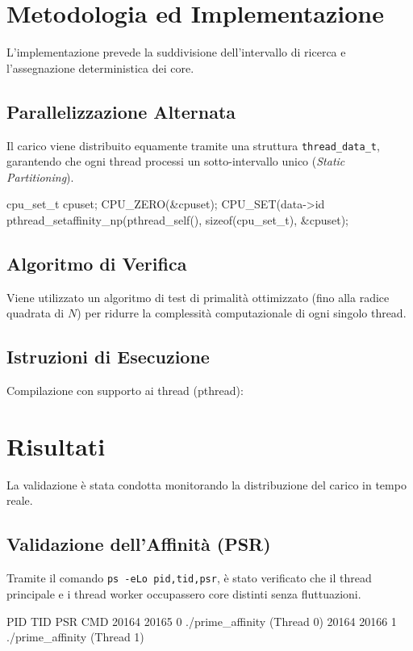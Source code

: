 \documentclass[a4paper,12pt]{article}
\begin{document}
\section{Metodologia ed Implementazione}
L'implementazione prevede la suddivisione dell'intervallo di ricerca e l'assegnazione deterministica dei core.

\subsection{Parallelizzazione Alternata}
Il carico viene distribuito equamente tramite una struttura \texttt{thread\_data\_t}, garantendo che ogni thread processi un sotto-intervallo unico (\textit{Static Partitioning}).
\begin{ccode}
cpu_set_t cpuset;
CPU_ZERO(&cpuset);
CPU_SET(data->id %
pthread_setaffinity_np(pthread_self(), sizeof(cpu_set_t), &cpuset);
\end{ccode}

\subsection{Algoritmo di Verifica}
Viene utilizzato un algoritmo di test di primalità ottimizzato (fino alla radice quadrata di $N$) per ridurre la complessità computazionale di ogni singolo thread.


\subsection{Istruzioni di Esecuzione}
Compilazione con supporto ai thread (pthread):

\section{Risultati}
La validazione è stata condotta monitorando la distribuzione del carico in tempo reale.

\subsection{Validazione dell'Affinità (PSR)}
Tramite il comando \texttt{ps -eLo pid,tid,psr}, è stato verificato che il thread principale e i thread worker occupassero core distinti senza fluttuazioni.
\begin{terminal}
  PID   TID PSR CMD
20164 20165   0 ./prime_affinity (Thread 0)
20164 20166   1 ./prime_affinity (Thread 1)
\end{terminal}
\end{document}

